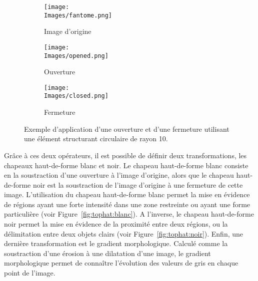 \documentclass[\main/main.tex]{subfiles}
\begin{document}
\begin{figure}[h]
    \centering
    \begin{subfigure}[b]{0.30\textwidth}
       \caption{
       Image d'origine
            }
       \centering \texttt{[image: \\Images/fantome.png]}
    \end{subfigure}
    \begin{subfigure}[b]{0.30\textwidth}
       \caption{
        \label{fig:ouverture}
            Ouverture
            }
       \centering \texttt{[image: \\Images/opened.png]}
    \end{subfigure}
    \begin{subfigure}[b]{0.30\textwidth}
       \caption{
        \label{fig:fermeture}
            Fermeture
            }
       \centering \texttt{[image: \\Images/closed.png]}
    \end{subfigure}
    \caption{
        Exemple d'application d'une ouverture et d'une fermeture utilisant une élément structurant circulaire de rayon 10.
    }
    
\end{figure}
%
Grâce à ces deux opérateurs, il est possible de définir deux transformations, les chapeaux haut-de-forme blanc et noir.
%
Le chapeau haut-de-forme blanc consiste en la soustraction d'une ouverture à l'image d'origine, alors que le chapeau haut-de-forme noir est la soustraction de l'image d'origine à une fermeture de cette image.
%
L'utilisation du chapeau haut-de-forme blanc permet la mise en évidence de régions ayant une forte intensité dans une zone restreinte ou ayant une forme particulière (voir Figure~\ref{fig:tophat:blanc}).
%
A l'inverse, le chapeau haut-de-forme noir permet la mise en évidence de la proximité entre deux régions, ou la délimitation entre deux objets clairs (voir Figure~\ref{fig:tophat:noir}).
%
Enfin, une dernière transformation est le gradient morphologique.
%
Calculé comme la soustraction d'une érosion à une dilatation d'une image,
le gradient morphologique permet de connaître l'évolution des valeurs de gris en chaque point de l'image.
\end{document}
